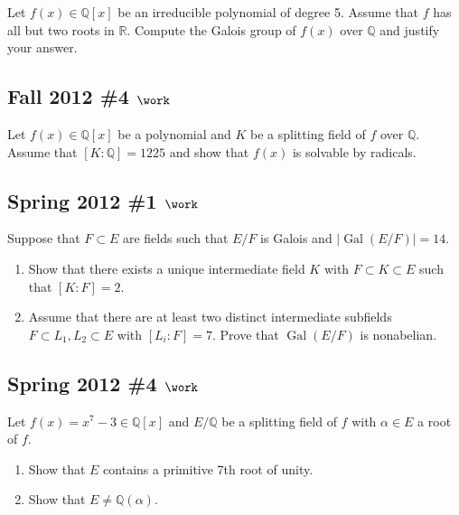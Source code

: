 Let \(f(x) \in {\mathbb{Q}}[x]\) be an irreducible polynomial of degree
5. Assume that \(f\) has all but two roots in \({\mathbb{R}}\). Compute
the Galois group of \(f(x)\) over \({\mathbb{Q}}\) and justify your
answer.

\hypertarget{fall-2012-4-work}{%
\subsection{\texorpdfstring{Fall 2012 \#4
\(\work\)}{Fall 2012 \#4 \textbackslash work}}\label{fall-2012-4-work}}

Let \(f(x) \in {\mathbb{Q}}[x]\) be a polynomial and \(K\) be a
splitting field of \(f\) over \({\mathbb{Q}}\). Assume that
\([K:{\mathbb{Q}}] = 1225\) and show that \(f(x)\) is solvable by
radicals.

\hypertarget{spring-2012-1-work}{%
\subsection{\texorpdfstring{Spring 2012 \#1
\(\work\)}{Spring 2012 \#1 \textbackslash work}}\label{spring-2012-1-work}}

Suppose that \(F\subset E\) are fields such that \(E/F\) is Galois and
\({\left\lvert {\operatorname{Gal}(E/F)} \right\rvert} = 14\).

\begin{enumerate}
\def\labelenumi{\alph{enumi}.}
\item
  Show that there exists a unique intermediate field \(K\) with
  \(F\subset K \subset E\) such that \([K: F] = 2\).
\item
  Assume that there are at least two distinct intermediate subfields
  \(F \subset L_1, L_2 \subset E\) with \([L_i: F]= 7\). Prove that
  \(\operatorname{Gal}(E/F)\) is nonabelian.
\end{enumerate}

\hypertarget{spring-2012-4-work}{%
\subsection{\texorpdfstring{Spring 2012 \#4
\(\work\)}{Spring 2012 \#4 \textbackslash work}}\label{spring-2012-4-work}}

Let \(f(x) = x^7 - 3\in {\mathbb{Q}}[x]\) and \(E/{\mathbb{Q}}\) be a
splitting field of \(f\) with \(\alpha \in E\) a root of \(f\).

\begin{enumerate}
\def\labelenumi{\alph{enumi}.}
\item
  Show that \(E\) contains a primitive 7th root of unity.
\item
  Show that \(E\neq {\mathbb{Q}}(\alpha)\).
\end{enumerate}

